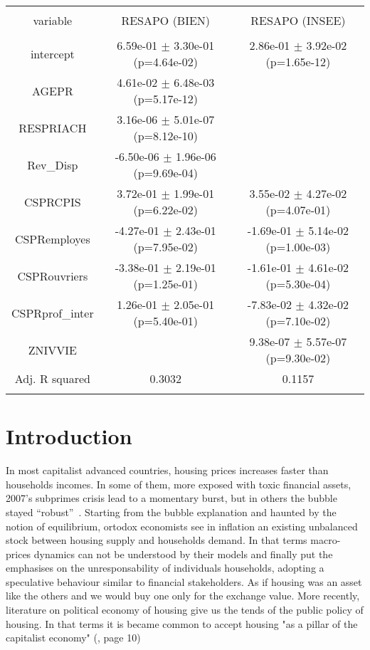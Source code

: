 \begin{table*}[!htbp] \centering 
  \caption{} 
  \label{} 
\begin{tabular}{@{\extracolsep{5pt}} ccc} 
\\[-1.8ex]\hline 
\hline \\[-1.8ex] 
variable & RESAPO (BIEN) & RESAPO (INSEE) \\ 
\hline \\[-1.8ex] 
intercept &  6.59e-01 $\pm$ 3.30e-01 (p=4.64e-02) &  2.86e-01 $\pm$ 3.92e-02 (p=1.65e-12) \\ 
AGEPR &  4.61e-02 $\pm$ 6.48e-03 (p=5.17e-12) &  \\ 
RESPRIACH &  3.16e-06 $\pm$ 5.01e-07 (p=8.12e-10) &  \\ 
Rev\_Disp & -6.50e-06 $\pm$ 1.96e-06 (p=9.69e-04) &  \\ 
CSPRCPIS &  3.72e-01 $\pm$ 1.99e-01 (p=6.22e-02) &  3.55e-02 $\pm$ 4.27e-02 (p=4.07e-01) \\ 
CSPRemployes & -4.27e-01 $\pm$ 2.43e-01 (p=7.95e-02) & -1.69e-01 $\pm$ 5.14e-02 (p=1.00e-03) \\ 
CSPRouvriers & -3.38e-01 $\pm$ 2.19e-01 (p=1.25e-01) & -1.61e-01 $\pm$ 4.61e-02 (p=5.30e-04) \\ 
CSPRprof\_inter &  1.26e-01 $\pm$ 2.05e-01 (p=5.40e-01) & -7.83e-02 $\pm$ 4.32e-02 (p=7.10e-02) \\ 
ZNIVVIE &  &  9.38e-07 $\pm$ 5.57e-07 (p=9.30e-02) \\ 
\hline Adj. R squared & 0.3032 & 0.1157 \\ 
\hline \\[-1.8ex] 
\end{tabular} 
\end{table*} 






\section{Introduction}

In most capitalist advanced countries, housing prices increases faster than households incomes. In some of them, more exposed with toxic financial assets, 2007's subprimes crisis lead to a momentary burst, but in others the bubble stayed ``robust''~\cite{timbeau2013bulles}. Starting from the bubble explanation and haunted by the notion of equilibrium, ortodox economists see in inflation an existing unbalanced stock between housing supply and households demand. In that terms macro-prices dynamics can not be understood by their models and finally put the emphasises on the unresponsability of individuals households, adopting a speculative behaviour similar to financial stakeholders. As if housing was an asset like the others and we would buy one only for the exchange value.
More recently, literature on political economy of housing give us the tends of the public policy of housing. In that terms it is became common to accept housing "as a pillar of the capitalist economy" (\cite{aalbers2016financialization}, page 10)

